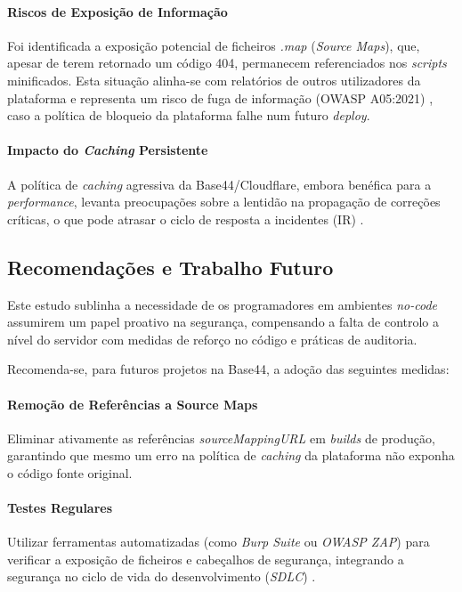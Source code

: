 \paragraph{Riscos de Exposição de Informação}
Foi identificada a exposição potencial de ficheiros \textit{.map} (\textit{Source Maps}), que, apesar de terem retornado um código 404,
permanecem referenciados nos \textit{scripts} minificados.
Esta situação alinha-se com relatórios de outros utilizadores da plataforma \cite{ref22} e representa um risco de fuga de informação (OWASP A05:2021) \cite{ref2},
caso a política de bloqueio da plataforma falhe num futuro \textit{deploy}.

\paragraph{Impacto do \textit{Caching} Persistente}
A política de \textit{caching} agressiva da Base44/Cloudflare, embora benéfica para a \textit{performance},
levanta preocupações sobre a lentidão na propagação de correções críticas, o que pode atrasar o ciclo de resposta a incidentes (IR) \cite{ref28}.

\subsection{Recomendações e Trabalho Futuro}

Este estudo sublinha a necessidade de os programadores em ambientes \textit{no-code} assumirem um papel proativo na segurança,
compensando a falta de controlo a nível do servidor com medidas de reforço no código e práticas de auditoria.

Recomenda-se, para futuros projetos na Base44, a adoção das seguintes medidas:

\paragraph{Remoção de Referências a Source Maps}
Eliminar ativamente as referências \textit{sourceMappingURL} em \textit{builds} de produção,
garantindo que mesmo um erro na política de \textit{caching} da plataforma não exponha o código fonte original.

\paragraph{Testes Regulares}
Utilizar ferramentas automatizadas (como \textit{Burp Suite} ou \textit{OWASP ZAP}) \cite{ref23} para verificar a exposição de ficheiros e cabeçalhos de segurança,
integrando a segurança no ciclo de vida do desenvolvimento (\textit{SDLC}) \cite{ref4}.

